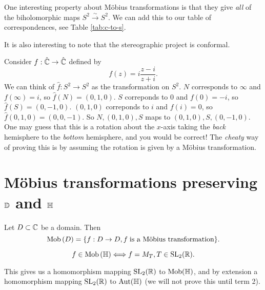 One interesting property about M\"obius transformations is that they give \emph{all} of the biholomorphic maps $S^2 \xrightarrow{\sim} S^2$. 
We can add this to our table of correspondences, see Table \ref{tab:c-to-s}.


It is also interesting to note that the stereographic project is conformal.

\begin{example}
    Consider $f: \hat {\mathbb{C}} \to \hat {\mathbb{C}}$ defined by
    \[ f(z) = i \frac{z-i}{z+i}. \]
    We can think of $\hat f: S^2 \to S^2$ as the transformation on $S^2$.
    $N$ corresponds to $\infty$ and $f(\infty) = i$, so $\hat f(N) = (0, 1, 0)$.
    $S$ correponds to $0$ and $f(0) = -i$, so $\hat f(S) = (0, -1, 0)$.
    $(0, 1, 0)$ correponds to $i$ and $f(i) = 0$, so $\hat f(0, 1, 0) = (0, 0, -1)$. So $N, (0, 1, 0), S$ maps to $(0, 1, 0), S, (0, -1, 0)$. %
    One may guess that this is a rotation about the $x$-axis taking the \emph{back} hemisphere to the \emph{bottom} hemisphere, and you would be correct! 
    The \emph{cheaty} way of proving this is by assuming the rotation is given by a M\"obius transformation.
\end{example}

\section{M\"obius transformations preserving $\mathbb{D}$ and $\mathbb{H}$}

\begin{definition}[]
    Let $D \subset \mathbb{C}$ be a domain. Then
    \[ \operatorname{Mob}{(D)} = \{ f: D \to D, f \;\text{is a M\"obius transformation}\}. \]
\end{definition}

\begin{proposition}[]
    \[ f \in \operatorname{Mob}{(\mathbb{H})} \Longleftrightarrow f = M_T, T \in \operatorname{SL}_2(\mathbb{R}). \]
\end{proposition}

\begin{remark}
    This gives us a homomorphism mapping $\operatorname{SL}_2(\mathbb{R})$ to $\operatorname{Mob}(\mathbb{H})$, and by extension a homomorphism mapping $\operatorname{SL}_2(\mathbb{R})$ to $\operatorname{Aut}(\mathbb{H})$ (we will not prove this until term 2).
\end{remark}

